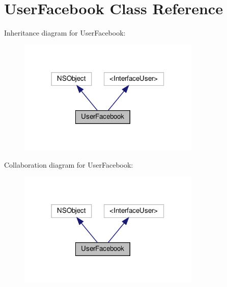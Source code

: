 \hypertarget{interfaceUserFacebook}{}\section{User\+Facebook Class Reference}
\label{interfaceUserFacebook}


Inheritance diagram for User\+Facebook\+:
\nopagebreak
\begin{figure}[H]
\begin{center}
\leavevmode
\includegraphics[width=246pt]{interfaceUserFacebook__inherit__graph}
\end{center}
\end{figure}


Collaboration diagram for User\+Facebook\+:
\nopagebreak
\begin{figure}[H]
\begin{center}
\leavevmode
\includegraphics[width=246pt]{interfaceUserFacebook__coll__graph}
\end{center}
\end{figure}

